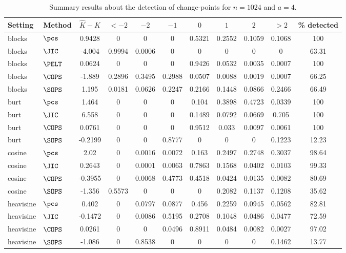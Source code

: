 \begin{table}[ht]
\centering
\begin{tabular}{llccccccccc}
  \hline
Setting & Method & $\hat{K} - K$ & $< -2$ & $-2$ & $-1$ & $0$ & $1$ & $2$ & $> 2$ & \% detected \\ 
  \hline
blocks & $\pcs$ & 0.9428 &     0 &     0 &     0 & 0.5321 & 0.2552 & 0.1059 & 0.1068 &   100 \\ 
  blocks & $\JIC$ & -4.004 & 0.9994 & 0.0006 &     0 &     0 &     0 &     0 &     0 & 63.31 \\ 
  blocks & $\PELT$ & 0.0624 &     0 &     0 &     0 & 0.9426 & 0.0532 & 0.0035 & 0.0007 &   100 \\ 
  blocks & $\COPS$ & -1.889 & 0.2896 & 0.3495 & 0.2988 & 0.0507 & 0.0088 & 0.0019 & 0.0007 & 66.25 \\ 
   \hline
blocks & $\SOPS$ & 1.195 & 0.0181 & 0.0626 & 0.2247 & 0.2166 & 0.1448 & 0.0866 & 0.2466 & 66.49 \\ 
  burt & $\pcs$ & 1.464 &     0 &     0 &     0 & 0.104 & 0.3898 & 0.4723 & 0.0339 &   100 \\ 
   \hline
burt & $\JIC$ & 6.558 &     0 &     0 &     0 & 0.1489 & 0.0792 & 0.0669 & 0.705 &   100 \\ 
  burt & $\COPS$ & 0.0761 &     0 &     0 &     0 & 0.9512 & 0.033 & 0.0097 & 0.0061 &   100 \\ 
   \hline
burt & $\SOPS$ & -0.2199 &     0 &     0 & 0.8777 &     0 &     0 &     0 & 0.1223 & 12.23 \\ 
  cosine & $\pcs$ &  2.02 &     0 & 0.0016 & 0.0072 & 0.163 & 0.2497 & 0.2748 & 0.3037 & 98.64 \\ 
   \hline
cosine & $\JIC$ & 0.2643 &     0 & 0.0001 & 0.0063 & 0.7863 & 0.1568 & 0.0402 & 0.0103 & 99.33 \\ 
  cosine & $\COPS$ & -0.3955 &     0 & 0.0068 & 0.4773 & 0.4518 & 0.0424 & 0.0135 & 0.0082 & 80.69 \\ 
  cosine & $\SOPS$ & -1.356 & 0.5573 &     0 &     0 &     0 & 0.2082 & 0.1137 & 0.1208 & 35.62 \\ 
  heavisine & $\pcs$ & 0.402 &     0 & 0.0797 & 0.0877 & 0.456 & 0.2259 & 0.0945 & 0.0562 & 82.81 \\ 
  heavisine & $\JIC$ & -0.1472 &     0 & 0.0086 & 0.5195 & 0.2708 & 0.1048 & 0.0486 & 0.0477 & 72.59 \\ 
  heavisine & $\COPS$ & 0.0261 &     0 &     0 & 0.0496 & 0.8911 & 0.0484 & 0.0082 & 0.0027 & 97.02 \\ 
  heavisine & $\SOPS$ & -1.086 &     0 & 0.8538 &     0 &     0 &     0 &     0 & 0.1462 & 13.77 \\ 
  \end{tabular}
\caption{Summary results about the detection of change-points for $n = 1024$ and $a = 4$.} 
\label{tab:CPn1024a4}
\end{table}
